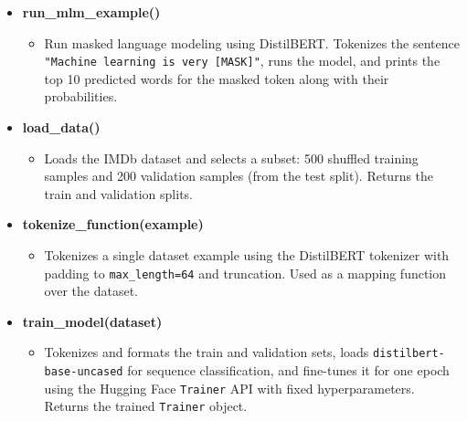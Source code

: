 \documentclass[12pt,fleqn]{article}
\begin{document}
\begin{itemize}
  \item \textbf{run\_mlm\_example()}
  \begin{itemize}
    \item Run masked language modeling using DistilBERT. Tokenizes the sentence \texttt{"Machine learning is very [MASK]"}, runs the model, and prints the top 10 predicted words for the masked token along with their probabilities.
  \end{itemize}

  \item \textbf{load\_data()}
  \begin{itemize}
    \item Loads the IMDb dataset and selects a subset: 500 shuffled training samples and 200 validation samples (from the test split). Returns the train and validation splits.
  \end{itemize}

  \item \textbf{tokenize\_function(example)}
  \begin{itemize}
    \item Tokenizes a single dataset example using the DistilBERT tokenizer with padding to \texttt{max\_length=64} and truncation. Used as a mapping function over the dataset.
  \end{itemize}

  \item \textbf{train\_model(dataset)}
  \begin{itemize}
    \item Tokenizes and formats the train and validation sets, loads \texttt{distilbert-base-uncased} for sequence classification, and fine-tunes it for one epoch using the Hugging Face \texttt{Trainer} API with fixed hyperparameters. Returns the trained \texttt{Trainer} object.
  \end{itemize}
\end{itemize}
\end{document}

